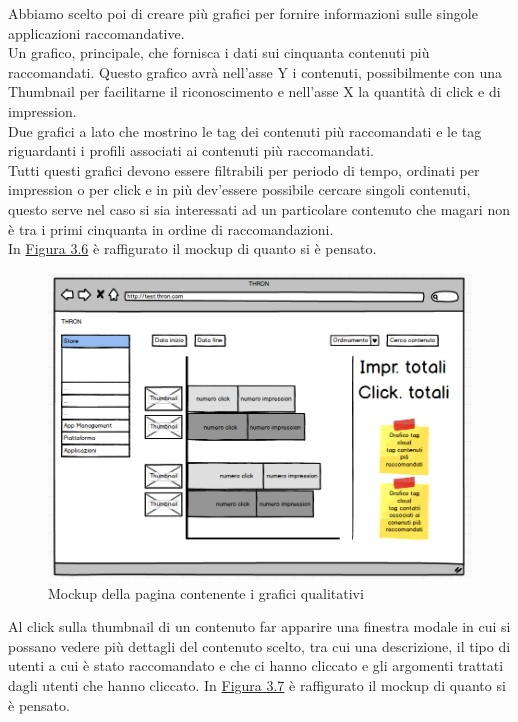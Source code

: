 \documentclass[a4paper, 12pt, twoside, openright]{book}
\begin{document}
Abbiamo scelto poi di creare più grafici per fornire informazioni sulle singole applicazioni raccomandative.\\
Un grafico, principale, che fornisca i dati sui cinquanta contenuti più raccomandati. Questo grafico avrà nell'asse Y i contenuti, possibilmente con una Thumbnail per facilitarne il riconoscimento e nell'asse X la quantità di click e di impression.\\
Due grafici a lato che mostrino le tag dei contenuti più raccomandati e le tag riguardanti i profili associati ai contenuti più raccomandati.\\
Tutti questi grafici devono essere filtrabili per periodo di tempo, ordinati per impression o per click e in più dev'essere possibile cercare singoli contenuti, questo serve nel caso si sia interessati ad un particolare contenuto che magari non è tra i primi cinquanta in ordine di raccomandazioni.\\
In \hyperref[grafico-qualitativo-1-mockup]{Figura 3.6} è raffigurato il mockup di quanto si è pensato.
\begin{figure}[H]
	\centering
	\label{grafico-quantitativo-mockup}	\includegraphics[width=1.0\textwidth]{images/grafico-qualitativo-1-mockup.jpg}
	\caption{Mockup della pagina contenente i grafici qualitativi}
\end{figure} 
Al click sulla thumbnail di un contenuto far apparire una finestra modale in cui si possano vedere più dettagli del contenuto scelto, tra cui una descrizione, il tipo di utenti a cui è stato raccomandato e che ci hanno cliccato e gli argomenti trattati dagli utenti che hanno cliccato.
In \hyperref[grafico-qualitativo-2-mockup]{Figura 3.7} è raffigurato il mockup di quanto si è pensato.
\end{document}
